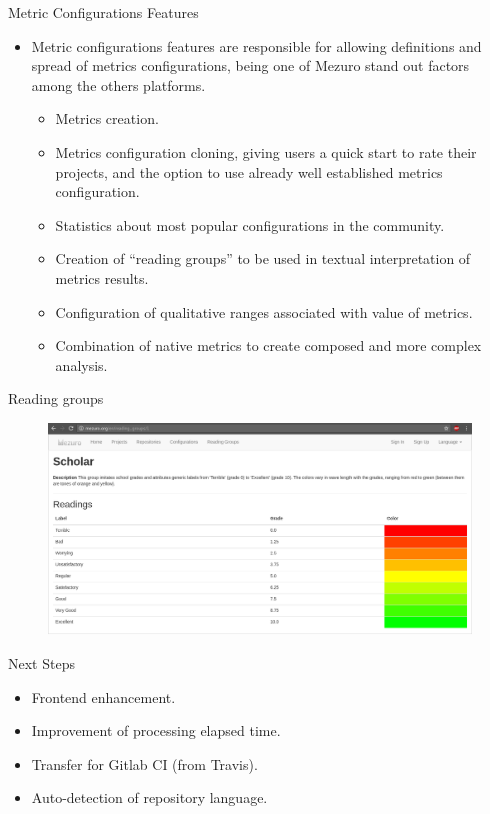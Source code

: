 \begin{block}{Metric Configurations Features}
    \begin{itemize}
        \item Metric configurations features are responsible for allowing
            definitions and spread of metrics configurations, being
            one of Mezuro stand out factors among the others platforms.
            \begin{itemize}
                \item Metrics creation.
                \item Metrics configuration cloning, giving users a quick start
                    to rate their projects, and the option to use already well
                    established metrics configuration.
                \item Statistics about most popular configurations in the
                    community.
                \item Creation of ``reading groups'' to be used in textual
                    interpretation of metrics results.
                \item Configuration of qualitative ranges associated with
                    value of metrics.
                \item Combination of native metrics to create composed and more
                    complex analysis.
            \end{itemize}
    \end{itemize}
\end{block}

\begin{block}{Reading groups}
    \begin{figure}
        \begin{center}
            \includegraphics[width=\textwidth]{figures/ReadingGroup.png}
            \label{fig:feature1}
        \end{center}
    \end{figure}
\end{block}

\begin{block}{Next Steps}
    \begin{itemize}
        \item Frontend enhancement.
        \item Improvement of processing elapsed time.
        \item Transfer for Gitlab CI (from Travis).
        \item Auto-detection of repository language.
    \end{itemize}
\end{block}
